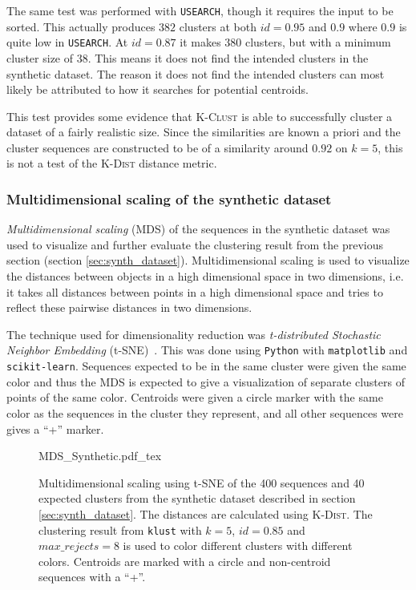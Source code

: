 The same test was performed with \texttt{USEARCH}, though it requires the input
to be sorted. This actually produces $382$ clusters at both $id=0.95$ and $0.9$
where $0.9$ is quite low in \texttt{USEARCH}. At $id=0.87$ it makes $380$
clusters, but with a minimum cluster size of $38$. This means it does not find
the intended clusters in the synthetic dataset. The reason it does not find the
intended clusters can most likely be attributed to how it searches for
potential centroids.

This test provides some evidence that \textsc{K-Clust} is able to successfully
cluster a dataset of a fairly realistic size. Since the similarities are known
a priori and the cluster sequences are constructed to be of a similarity around
$0.92$ on $k=5$, this is not a test of the \textsc{K-Dist} distance metric.

\subsubsection{Multidimensional scaling of the synthetic dataset}
\label{sec:mds_synth}

\emph{Multidimensional scaling} (MDS) of the sequences in the synthetic dataset
was used to visualize and further evaluate the clustering result from the
previous section (section \ref{sec:synth_dataset}). Multidimensional scaling is
used to visualize the distances between objects in a high dimensional space in
two dimensions, i.e. it takes all distances between points in a high
dimensional space and tries to reflect these pairwise distances in two
dimensions.

The technique used for dimensionality reduction was \emph{t-distributed
Stochastic Neighbor Embedding} (t-SNE)~\cite{maaten}. This was done using
\texttt{Python} with \texttt{matplotlib} and \texttt{scikit-learn}. Sequences
expected to be in the same cluster were given the same color and thus the MDS
is expected to give a visualization of separate clusters of points of the same
color. Centroids were given a circle marker with the same color as the
sequences in the cluster they represent, and all other sequences were gives a
``+'' marker.

\begin{figure}[h!]
  \def\svgwidth{\columnwidth}
  {MDS_Synthetic.pdf_tex}
  \caption{Multidimensional scaling using t-SNE of the 400 sequences and
    40 expected clusters from the synthetic dataset described in section
    \ref{sec:synth_dataset}. The distances are calculated using
    \textsc{K-Dist}. The clustering result from \texttt{klust} with $k=5$,
    $id=0.85$ and $max\_rejects=8$ is used to color different clusters with
    different colors. Centroids are marked with a circle and non-centroid
    sequences with a ``+''.}
  \label{fig:mds_synth}
\end{figure}

